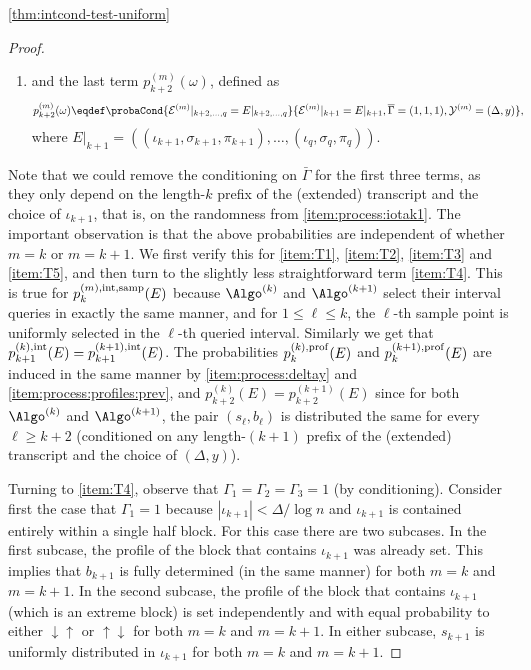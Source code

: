 \begin{proofof}{\cref{thm:intcond-test-uniform}}
\begin{proof}
\begin{enumerate}
\item\label{item:T5} and the last term $p^{(m)}_{k+2}(\omega)$, defined as
  \begin{align*}
    p^{(m)}_{k+2}(\omega)
      &\eqdef \probaCond{ \mathcal{E}^{(m)}|_{k+2,\dots, q} = E|_{k+2,\dots, q} }{ \mathcal{E}^{(m)}|_{k+1} = E|_{k+1}, \overline{\Gamma} = (1,1,1), \mathcal{Y}^{(m)}=(\Delta,y) },
  \end{align*}
  where $E|_{k+1}=((\iota_{k+1},\sigma_{k+1},\pi_{k+1}),\dots,(\iota_{q},\sigma_{q},\pi_{q}))$.
\end{enumerate}
Note that we could remove the conditioning on $\bar{\Gamma}$ for the first three terms,
as they only depend on the length-$k$ prefix of the (extended) transcript and the choice of $\iota_{k+1}$, that is, on the randomness from \eqref{item:process:iotak1}. The important observation is that the above probabilities are
independent of whether $m=k$ or $m=k+1$. We first verify this for \eqref{item:T1}, \eqref{item:T2}, \eqref{item:T3} and \eqref{item:T5}, and
then turn to the slightly less straightforward term \eqref{item:T4}. 
This is true for $p^{(m),\rm int, samp}_k(E)$  because $\Algo^{(k)}$ and $\Algo^{(k+1)}$ select their interval queries in exactly the same manner, and for $1 \leq \ell \leq k$, the $\ell$-th sample point is uniformly selected in the $\ell$-th queried interval. Similarly we get that $p^{(k),\rm int}_{k+1}(E) = p^{(k+1),\rm int}_{k+1}(E)$. The probabilities $p^{(k),\rm prof}_k(E)$ and $p^{(k+1),\rm prof}_k(E)$ are induced in the same manner by \eqref{item:process:deltay} and \eqref{item:process:profiles:prev}, and
  $p^{(k)}_{k+2}(E)=p^{(k+1)}_{k+2}(E)$ since for both $\Algo^{(k)}$ and $\Algo^{(k+1)}$, the pair $(s_\ell,b_\ell)$ is distributed the same for every $\ell \geq k+2$
 (conditioned on any length-$(k+1)$ prefix of the (extended) transcript and the
 choice of $(\Delta,y)$).

Turning to \eqref{item:T4}, observe that $\Gamma_1=\Gamma_2=\Gamma_3 =1$ (by conditioning).
Consider first the case that
$\Gamma_1=1$ because $|\iota_{k+1}| < \Delta/\log n$ and $\iota_{k+1}$
is contained entirely within a single half block. 
For this case there are two subcases. In the first subcase, the profile
of the block that contains $\iota_{k+1}$ was already set. This implies that $b_{k+1}$ is fully
determined (in the same manner) for both $m=k$ and $m=k+1$. In the second subcase, the profile
of the block that contains $\iota_{k+1}$ (which is an extreme block) is set independently and with equal probability to either $\downarrow\uparrow$ or $\uparrow\downarrow$ for both $m=k$ and $m=k+1$.
In either subcase, $s_{k+1}$ is uniformly distributed in $\iota_{k+1}$ for both $m=k$ and $m=k+1$.



\end{proof}
\end{proofof}
